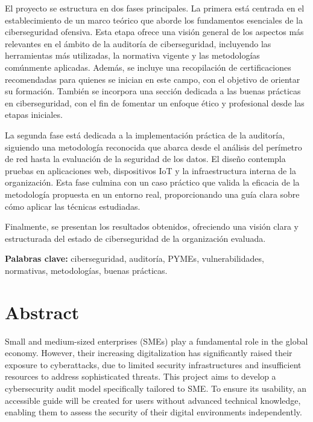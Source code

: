 \documentclass[a4paper, 11pt]{article}
\begin{document}
\par\vspace{0.5cm}

El proyecto se estructura en dos fases principales. La primera está centrada en el establecimiento de un marco teórico que aborde los fundamentos esenciales de la ciberseguridad ofensiva. Esta etapa ofrece una visión general de los aspectos más relevantes en el ámbito de la auditoría de ciberseguridad, incluyendo las herramientas más utilizadas, la normativa vigente y las metodologías comúnmente aplicadas. Además, se incluye una recopilación de certificaciones recomendadas para quienes se inician en este campo, con el objetivo de orientar su formación. También se incorpora una sección dedicada a las buenas prácticas en ciberseguridad, con el fin de fomentar un enfoque ético y profesional desde las etapas iniciales.

\par\vspace{0.5cm}

La segunda fase está dedicada a la implementación práctica de la auditoría, siguiendo una metodología reconocida que abarca desde el análisis del perímetro de red hasta la evaluación de la seguridad de los datos. El diseño contempla pruebas en aplicaciones web, dispositivos IoT y la infraestructura interna de la organización. Esta fase culmina con un caso práctico que valida la eficacia de la metodología propuesta en un entorno real, proporcionando una guía clara sobre cómo aplicar las técnicas estudiadas.

\par\vspace{0.5cm}

Finalmente, se presentan los resultados obtenidos, ofreciendo una visión clara y estructurada del estado de ciberseguridad de la organización evaluada.
\par\vspace{0.5cm}
\textbf{Palabras clave:} ciberseguridad, auditoría, PYMEs, vulnerabilidades, normativas, metodologías, buenas prácticas.
\clearpage

\thispagestyle{nohead}

\section*{Abstract}
Small and medium-sized enterprises (SMEs) play a fundamental role in the global economy. However, their increasing digitalization has significantly raised their exposure to cyberattacks, due to limited security infrastructures and insufficient resources to address sophisticated threats.
This project aims to develop a cybersecurity audit model specifically tailored to SME. To ensure its usability, an accessible guide will be created for users without advanced technical knowledge, enabling them to assess the security of their digital environments independently.
\end{document}
